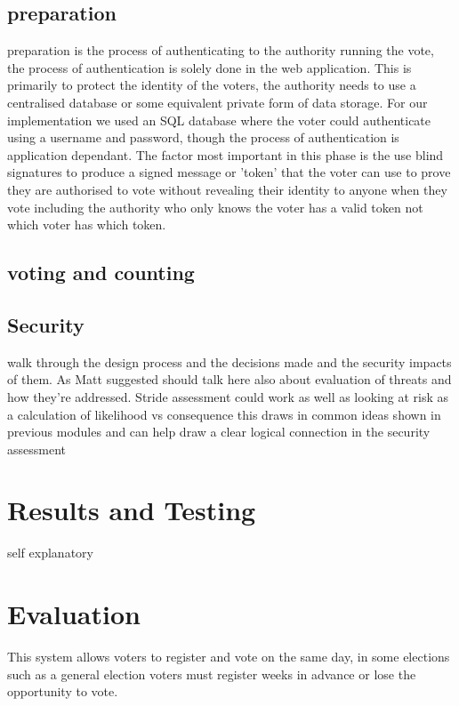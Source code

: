 \documentclass{entcs}
\begin{document}

\subsection{preparation}
preparation is the process of authenticating to the authority running the vote, the process of authentication is solely done in the web application. This is primarily to protect the identity of the voters, the authority needs to use a centralised database or some equivalent private form of data storage. For our implementation we used an SQL database where the voter could authenticate using a username and password, though the process of authentication is application dependant. The factor most important in this phase is the use blind signatures to produce a signed message or 'token' that the voter can use to prove they are authorised to vote without revealing their identity to anyone when they vote including the authority who only knows the voter has a valid token not which voter has which token.

\subsection{voting and counting}

\subsection{Security}
walk through the design process and the decisions made and the security impacts of them.
As Matt suggested should talk here also about evaluation of threats and how they're addressed. 
Stride assessment could work as well as looking at risk as a calculation of likelihood vs consequence this draws in common ideas shown in previous modules and can help draw a clear logical connection in the security assessment

\section{Results and Testing}
self explanatory 


\section{Evaluation}
This system allows voters to register and vote on the same day, in some elections such as a general election voters must register weeks in advance or lose the opportunity to vote.
\end{document}
